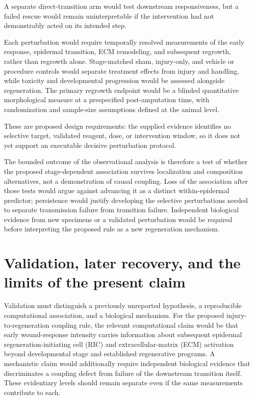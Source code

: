 \documentclass[11pt]{article}
\begin{document}
A separate direct-transition arm would test downstream responsiveness, but a failed rescue would remain uninterpretable if the intervention had not demonstrably acted on its intended step.

Each perturbation would require temporally resolved measurements of the early response, epidermal transition, ECM remodeling, and subsequent regrowth, rather than regrowth alone. Stage-matched sham, injury-only, and vehicle or procedure controls would separate treatment effects from injury and handling, while toxicity and developmental progression would be assessed alongside regeneration. The primary regrowth endpoint would be a blinded quantitative morphological measure at a prespecified post-amputation time, with randomization and sample-size assumptions defined at the animal level.

These are proposed design requirements: the supplied evidence identifies no selective target, validated reagent, dose, or intervention window, so it does not yet support an executable decisive perturbation protocol.

The bounded outcome of the observational analysis is therefore a test of whether the proposed stage-dependent association survives localization and composition alternatives, not a demonstration of causal coupling. Loss of the association after those tests would argue against advancing it as a distinct within-epidermal predictor; persistence would justify developing the selective perturbations needed to separate transmission failure from transition failure. Independent biological evidence from new specimens or a validated perturbation would be required before interpreting the proposed rule as a new regeneration mechanism.

\section{Validation, later recovery, and the limits of the present claim}
Validation must distinguish a previously unreported hypothesis, a reproducible computational association, and a biological mechanism. For the proposed injury-to-regeneration coupling rule, the relevant computational claim would be that early wound-response intensity carries information about subsequent epidermal regeneration-initiating cell (RIC) and extracellular-matrix (ECM) activation beyond developmental stage and established regenerative programs. A mechanistic claim would additionally require independent biological evidence that discriminates a coupling defect from failure of the downstream transition itself. These evidentiary levels should remain separate even if the same measurements contribute to each.
\end{document}
